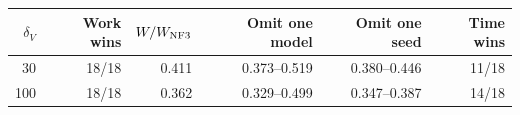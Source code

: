 \begin{tabular}{rrrrrr}
\toprule
$\delta_V$ & Work wins & $W/W_{\rm NF3}$ & Omit one model & Omit one seed & Time wins\\
\midrule
30 & 18/18 & 0.411 & 0.373--0.519 & 0.380--0.446 & 11/18\\
100 & 18/18 & 0.362 & 0.329--0.499 & 0.347--0.387 & 14/18\\
\bottomrule
\end{tabular}
